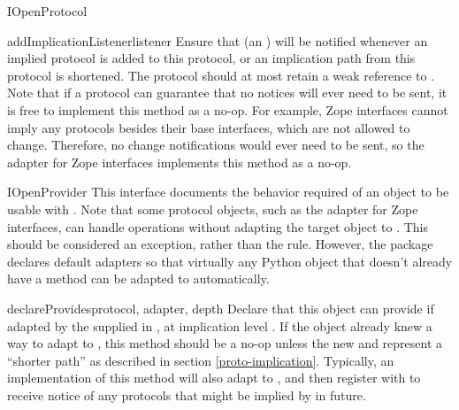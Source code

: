 \begin{verbatim%
}
\begin{verbatim%
}
\begin{verbatim%
}
\begin{verbatim%
}
\begin{verbatim%
}
\begin{verbatim%
}
\begin{classdesc*}{IOpenProtocol}
\begin{methoddesc}{addImplicationListener}{listener}
Ensure that  (an ) will be notified
whenever an implied protocol is added to this protocol, or an implication path
from this protocol is shortened.  The protocol should at most retain a weak
reference to .  Note that if a protocol can guarantee that no
notices will ever need to be sent, it is free to implement this method as a
no-op.  For example, Zope interfaces cannot imply any protocols besides their
base interfaces, which are not allowed to change.  Therefore, no change
notifications would ever need to be sent, so the  adapter
for Zope interfaces implements this method as a no-op.
\end{methoddesc}



\end{classdesc*}












\begin{classdesc*}{IOpenProvider}
This interface documents the behavior required of an object to be usable with
.  Note that some protocol objects, such as the
 adapter for Zope interfaces, can handle
 operations without adapting the target object to
.  This should be considered an exception, rather than the
rule.  However, the  package declares default adapters so
that virtually any Python object that doesn't already have a
 method can be adapted to 
automatically.

\begin{methoddesc}{declareProvides}{protocol, adapter, depth}
Declare that this object can provide  if adapted by the
 supplied in , at implication level
.  If the object already knew a way to adapt to , this
method should be a no-op unless the new  and  represent
a ``shorter path'' as described in section \ref{proto-implication}.  Typically,
an implementation of this method will also adapt  to
, and then register with 
to receive notice of any protocols that might be implied by 
in future.
\end{methoddesc}


\end{classdesc*}
\end{verbatim%
}
\end{verbatim%
}
\end{verbatim%
}
\end{verbatim%
}
\end{verbatim%
}
\end{verbatim%
}
